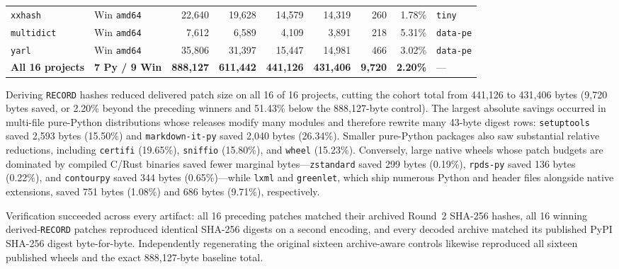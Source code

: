 \documentclass[10pt,letterpaper]{article}
\theoremstyle{remark}
\begin{document}
\begin{table}[htbp]
\begin{tabular}{@{}llrrrrrrl@{}}
\texttt{xxhash} & Win \texttt{amd64} & 22,640 & 19,628 & 14,579 & 14,319 & 260 & 1.78\% & \texttt{tiny} \\
\texttt{multidict} & Win \texttt{amd64} & 7,612 & 6,589 & 4,109 & 3,891 & 218 & 5.31\% & \texttt{data-pe} \\
\texttt{yarl} & Win \texttt{amd64} & 35,806 & 31,397 & 15,447 & 14,981 & 466 & 3.02\% & \texttt{data-pe} \\
\midrule
\textbf{All 16 projects} & \textbf{7 Py / 9 Win} & \textbf{888,127} & \textbf{611,442} & \textbf{441,126} & \textbf{431,406} & \textbf{9,720} & \textbf{2.20\%} & --- \\
\bottomrule
\end{tabular}
\end{table}

Deriving \texttt{RECORD} hashes reduced delivered patch size on all 16 of 16 projects, cutting the cohort total from 441,126 to 431,406 bytes (9,720 bytes saved, or 2.20\% beyond the preceding winners and 51.43\% below the 888,127-byte control). The largest absolute savings occurred in multi-file pure-Python distributions whose releases modify many modules and therefore rewrite many 43-byte digest rows: \texttt{setuptools} saved 2,593 bytes (15.50\%) and \texttt{markdown-it-py} saved 2,040 bytes (26.34\%). Smaller pure-Python packages also saw substantial relative reductions, including \texttt{certifi} (19.65\%), \texttt{sniffio} (15.80\%), and \texttt{wheel} (15.23\%). Conversely, large native wheels whose patch budgets are dominated by compiled C/Rust binaries saved fewer marginal bytes---\texttt{zstandard} saved 299 bytes (0.19\%), \texttt{rpds-py} saved 136 bytes (0.22\%), and \texttt{contourpy} saved 344 bytes (0.65\%)---while \texttt{lxml} and \texttt{greenlet}, which ship numerous Python and header files alongside native extensions, saved 751 bytes (1.08\%) and 686 bytes (9.71\%), respectively.

Verification succeeded across every artifact: all 16 preceding patches matched their archived Round~2 SHA-256 hashes, all 16 winning derived-\texttt{RECORD} patches reproduced identical SHA-256 digests on a second encoding, and every decoded archive matched its published PyPI SHA-256 digest byte-for-byte. Independently regenerating the original sixteen archive-aware controls likewise reproduced all sixteen published wheels and the exact 888,127-byte baseline total.
\end{document}
